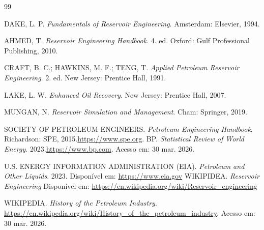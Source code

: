 \documentclass[12pt,a4paper]{report}
\begin{document}
\begin{thebibliography}{99}

DAKE, L. P. \textit{Fundamentals of Reservoir Engineering}. Amsterdam: Elsevier, 1994.

AHMED, T. \textit{Reservoir Engineering Handbook}. 4. ed. Oxford: Gulf Professional Publishing, 2010.

CRAFT, B. C.; HAWKINS, M. F.; TENG, T. \textit{Applied Petroleum Reservoir Engineering}. 2. ed. New Jersey: Prentice Hall, 1991.

LAKE, L. W. \textit{Enhanced Oil Recovery}. New Jersey: Prentice Hall, 2007.

MUNGAN, N. \textit{Reservoir Simulation and Management}. Cham: Springer, 2019.

SOCIETY OF PETROLEUM ENGINEERS. \textit{Petroleum Engineering Handbook}. Richardson: SPE, 2015.\url{https://www.spe.org}. 
BP. \textit{Statistical Review of World Energy}. 2023.\url{https://www.bp.com}. Acesso em: 30 mar. 2026.

U.S. ENERGY INFORMATION ADMINISTRATION (EIA). \textit{Petroleum and Other Liquids}. 2023. Disponível em: \url{https://www.eia.gov}
WIKIPIDEA.  \textit{Reservoir Engineering} Disponível em: \url{https://en.wikipedia.org/wiki/Reservoir_engineering} 

WIKIPEDIA. \textit{History of the Petroleum Industry}. \url{https://en.wikipedia.org/wiki/History_of_the_petroleum_industry}. Acesso em: 30 mar. 2026.

\end{thebibliography}
\end{document}
